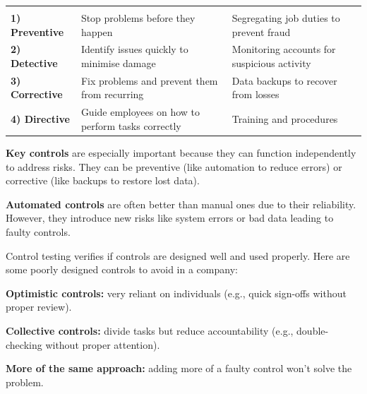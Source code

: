 
\noindent\begin{minipage}{\textwidth}
\renewcommand{\arraystretch}{1.35}
\begin{tabularx}{\textwidth}{@{}L{0.17\textwidth}YL{0.34\textwidth}@{}}
  &  & \\
{\tabfont \textbf{1) Preventive}} & {\tabfont Stop problems before they happen} & {\tabfont Segregating job duties to prevent fraud}\\
{\tabfont \textbf{2) Detective}} & {\tabfont Identify issues quickly to minimise damage} & {\tabfont Monitoring accounts for suspicious activity}\\
{\tabfont \textbf{3) Corrective}} & {\tabfont Fix problems and prevent them from recurring} & {\tabfont Data backups to recover from losses}\\
{\tabfont \textbf{4) Directive}} & {\tabfont Guide employees on how to perform tasks correctly} & {\tabfont Training and procedures}\\
\end{tabularx}
\end{minipage}


\begin{orkeybox}
\textbf{Key controls} are especially important because they can function
independently to address risks. They can be preventive (like automation to reduce
errors) or corrective (like backups to restore lost data).\par
\vspace{5pt}
\textbf{Automated controls} are often better than manual ones due to their
reliability. However, they introduce new risks like system errors or bad data
leading to faulty controls.
\end{orkeybox}


Control testing verifies if controls are designed well and used properly. Here are
some poorly designed controls to avoid in a company:

\begin{lettered}
\item \textbf{Optimistic controls:} very reliant on individuals (e.g., quick
sign-offs without proper review).
\item \textbf{Collective controls:} divide tasks but reduce accountability (e.g.,
double-checking without proper attention).
\item \textbf{More of the same approach:} adding more of a faulty control won't
solve the problem.
\end{lettered}

